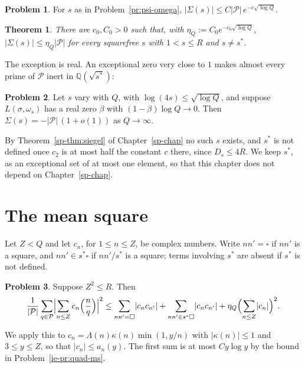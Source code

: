 \documentclass[reqno]{amsart}
\newcounter{chap}
\theoremstyle{definition}
\newtheorem{problem}{Problem}[section]
\theoremstyle{plain}
\newtheorem{theorem}{Theorem}[section]
\newcommand{\Q}{\mathbb{Q}}
\newcommand{\Pc}{\mathcal{P}}
\newcommand{\leg}[2]{\Bigl(\frac{#1}{#2}\Bigr)}
\newcommand{\sq}{\square}
\begin{document}
\begin{problem}\label{pr:Sigma}
For $s$ as in Problem~\ref{pr:psi-omega}, $\lvert \Sigma(s) \rvert \le C \lvert \Pc \rvert\, e^{-c\sqrt{\log Q}}$.
\end{problem}

\begin{theorem}\label{thm:legendre}
There are $c_0, C_0 > 0$ such that, with $\eta_Q := C_0 e^{-c_0\sqrt{\log Q}}$, $\lvert \Sigma(s) \rvert \le \eta_Q \lvert \Pc \rvert$ for every squarefree $s$ with $1 < s \le R$ and $s \ne s^*$.
\end{theorem}

The exception is real.  An exceptional zero very close to $1$ makes almost every prime of $\Pc$ inert in $\Q(\sqrt{s^*})$:

\begin{problem}\label{pr:exc-bias}
Let $s$ vary with $Q$, with $\log(4s) \le \sqrt{\log Q}$, and suppose $L(\sigma, \omega_s)$ has a real zero $\beta$ with $(1 - \beta)\log Q \to 0$.  Then $\Sigma(s) = -\lvert \Pc \rvert\,(1 + o(1))$ as $Q \to \infty$.
\end{problem}

By Theorem~\ref{sp-thm:siegel} of Chapter~\ref{sp-chap} no such $s$ exists, and $s^*$ is not defined once $c_2$ is at most half the constant $c$ there, since $D_s \le 4R$.  We keep $s^*$, as an exceptional set of at most one element, so that this chapter does not depend on Chapter~\ref{sp-chap}.


\section{The mean square}\label{sec:meansq}

Let $Z < Q$ and let $c_n$, for $1 \le n \le Z$, be complex numbers.  Write $n n' = \sq$ if $n n'$ is a square, and $n n' \in s^* \sq$ if $n n'/s^*$ is a square; terms involving $s^*$ are absent if $s^*$ is not defined.

\begin{problem}\label{pr:ms-expand}
Suppose $Z^2 \le R$.  Then
\[
  \frac{1}{\lvert \Pc \rvert} \sum_{q \in \Pc} \Bigl\lvert \sum_{n \le Z} c_n \leg{n}{q} \Bigr\rvert^2
  \le \sum_{n n' = \sq} \lvert c_n c_{n'} \rvert
  + \sum_{n n' \in s^* \sq} \lvert c_n c_{n'} \rvert
  + \eta_Q \Bigl( \sum_{n \le Z} \lvert c_n \rvert \Bigr)^2 .
\]
\end{problem}

We apply this to $c_n = \Lambda(n) \kappa(n) \min(1, y/n)$ with $\lvert \kappa(n) \rvert \le 1$ and $3 \le y \le Z$, so that $\lvert c_n \rvert \le a_n(y)$.  The first sum is at most $C y \log y$ by the bound in Problem~\ref{ie-pr:quad-ms}.
\end{document}
